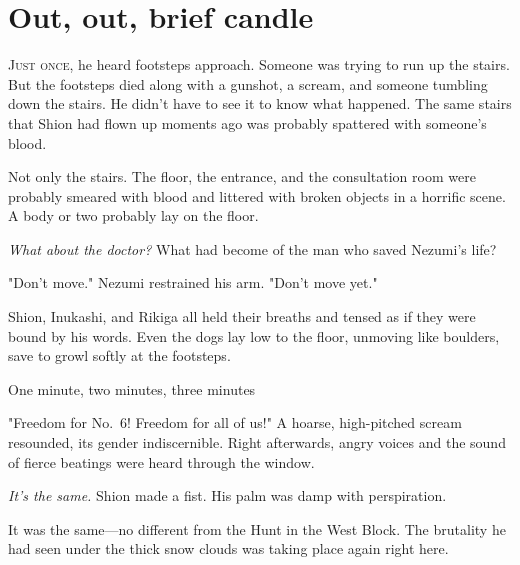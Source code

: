 
\chapter{Out, out, brief candle}


\lettrine{J}{ust once}, he heard footsteps approach. Someone was trying to run up the
stairs. But the footsteps died along with a gunshot, a scream, and
someone tumbling down the stairs. He didn't have to see it to know what
happened. The same stairs that Shion had flown up moments ago was
probably spattered with someone's blood.

Not only the stairs. The floor, the entrance, and the consultation room
were probably smeared with blood and littered with broken objects in a
horrific scene. A body or two probably lay on the floor.

\emph{What about the doctor?} What had become of the man who saved Nezumi's
life?

"Don't move." Nezumi restrained his arm. "Don't move yet."

Shion, Inukashi, and Rikiga all held their breaths and tensed as if they
were bound by his words. Even the dogs lay low to the floor, unmoving
like boulders, save to growl softly at the footsteps.

One minute, two minutes, three minutes\el 

"Freedom for No.~6! Freedom for all of us!" A hoarse, high-pitched
scream resounded, its gender indiscernible. Right afterwards, angry
voices and the sound of fierce beatings were heard through the window.

\emph{It's the same.} Shion made a fist. His palm was damp with perspiration.

It was the same---no different from the Hunt in the West Block. The
brutality he had seen under the thick snow clouds was taking place again
right here.

